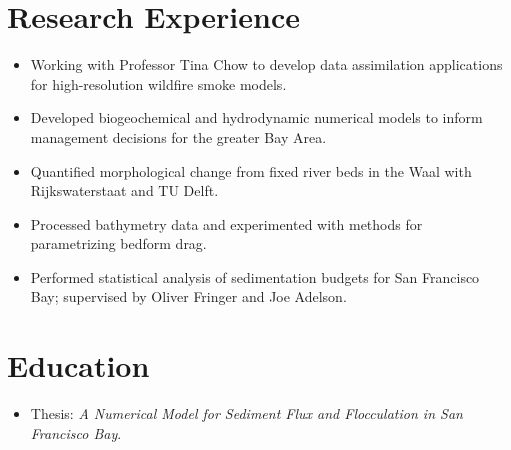 \section*{Research Experience}

\begin{itemize}
  \item Working with Professor Tina Chow to develop data assimilation applications for high-resolution wildfire smoke models.
\end{itemize}

\begin{itemize}
  \item Developed biogeochemical and hydrodynamic numerical models to inform management decisions for the greater Bay Area.
\end{itemize}

\begin{itemize}
  \item Quantified morphological change from fixed river beds in the Waal with Rijkswaterstaat and TU Delft.
\end{itemize}

\begin{itemize}
  \item Processed bathymetry data and experimented with methods for parametrizing bedform drag.
\end{itemize}

\begin{itemize}
  \item Performed statistical analysis of sedimentation budgets for San Francisco Bay; supervised by Oliver Fringer and Joe Adelson.
\end{itemize}

\section*{Education}

\begin{itemize}
  \item Thesis: \textit{A Numerical Model for Sediment Flux and Flocculation in San Francisco Bay}.
\end{itemize}

